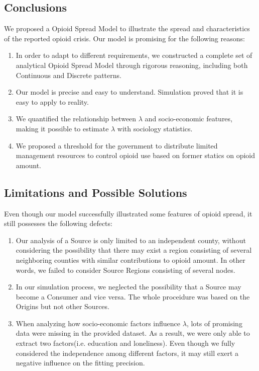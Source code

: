 \subsection{Conclusions}
We proposed a Opioid Spread Model to illustrate the spread and characteristics of the reported opioid crisis. Our model is promising for the following reasons:
\begin{enumerate}
	\item In order to adapt to different requirements, we constructed a complete set of analytical Opioid Spread Model through rigorous reasoning, including both Continuous and Discrete patterns. 
	
	\item Our model is precise and easy to understand. Simulation proved that it is easy to apply to reality.
	
	\item We quantified the relationship between $\lambda$ and socio-economic features, making it possible to estimate $\lambda$ with sociology statistics.
	
	\item We proposed a threshold for the government to distribute limited management resources to control opioid use based on former statics on opioid amount.
\end{enumerate}

\subsection{Limitations and Possible Solutions}
Even though our model successfully illustrated some features of opioid spread, it still possesses the following defects:
\begin{enumerate}
	\item Our analysis of a Source is only limited to an independent county, without considering the possibility that there may exist a region consisting of several neighboring counties with similar contributions to opioid amount. In other words, we failed to consider Source Regions consisting of several nodes.
	
	\item  In our simulation process, we neglected the possibility that a Source may become a Consumer and vice versa. The whole proceidure was based on the Origins but not other Sources.
	
	\item  When analyzing how socio-economic factors influence $\lambda$, lots of promising data were missing in the provided dataset. As a result, we were only able to extract two factors(i.e. education and loneliness). Even though we fully considered the independence among different factors, it may still exert a negative influence on the fitting precision. 
\end{enumerate}



